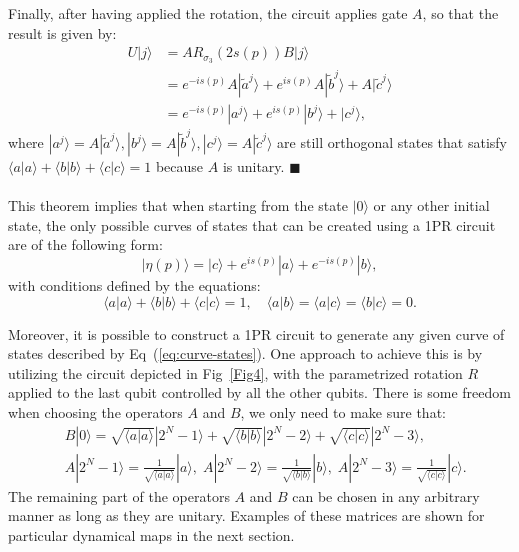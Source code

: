 \documentclass[10pt,letterpaper]{article} %
\newcommand{\fref}[1]{Fig~\ref{#1}}
\newcommand{\eref}[1]{Eq~(\ref{#1})}
\begin{document}
Finally, after having applied the rotation, the circuit applies gate $A$, 
so that the result is given by:
\begin{align}
U|j\rangle &= AR_{\sigma_3}(2s(p)) B|j\rangle \nonumber \\
           &= e^{-is(p)} A |\tilde{a}^j\rangle + e^{is(p)} A |\tilde{b}^j\rangle 
              + A |\tilde{c}^j\rangle \nonumber \\
           &= e^{-is(p)} |a^j\rangle + e^{is(p)} |b^j\rangle + |c^j\rangle,
\end{align}
where $|a^j\rangle = A |\tilde{a}^j\rangle, |b^j\rangle = A |\tilde{b}^j\rangle, |c^j\rangle = A |\tilde{c}^j\rangle$ are still orthogonal
states that satisfy $\langle a| a\rangle + \langle b| b\rangle + \langle c| c\rangle = 1$ because $A$ is unitary. $\blacksquare$  \\
 $\;$ \\

This theorem implies that when starting from the state $|0\rangle$ 
or any other initial state, the only possible curves of states that can be 
created using a 1PR circuit are of the following form:
\begin{equation}
|\eta(p)\rangle = |c\rangle + e^{is(p)}|a\rangle + e^{-is(p)} |b\rangle,
\label{eq:curve-states}
\end{equation}
with conditions defined by the equations: 
\begin{equation}
\langle a| a\rangle + \langle b| b\rangle + \langle c| c\rangle = 1,  \quad
\langle a |b\rangle =
\langle a |c\rangle =
\langle b |c\rangle = 0.
\label{eq:conditions-vecs}
\end{equation}

Moreover, it is possible to construct a 1PR circuit to generate any given curve of 
states described by \eref{eq:curve-states}. 
One approach to achieve this is by utilizing the circuit 
depicted in \fref{Fig4}, 
with the parametrized rotation $R$ applied to the last qubit controlled by all the 
other qubits. There is some freedom when choosing
the operators $A$ and $B$, we only need
to make sure that:
\begin{align}
&B|0\rangle = \sqrt{\langle a | a \rangle} |2^{N}-1 \rangle + \sqrt{\langle b | b \rangle} |2^{N}-2\rangle + \sqrt{\langle c |c \rangle} |2^N-3\rangle, \nonumber \\
&A|2^N-1 \rangle = \frac{1}{\sqrt{\langle a | a \rangle}} |a\rangle,\; A|2^{N}-2\rangle = \frac{1}{\sqrt{\langle b | b \rangle}}|b\rangle, \; A|2^{N}-3\rangle = \frac{1}{\sqrt{\langle c | c \rangle}}|c\rangle.
\label{eq:BA}
\end{align}
The remaining part of the operators $A$ and $B$ can be chosen
in any arbitrary manner as long as they are unitary. 
Examples of these matrices are shown for particular dynamical maps in the next section.
\end{document}
